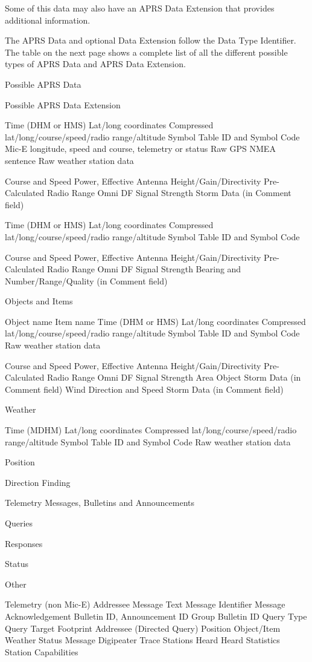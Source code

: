 Some of this data may also have an APRS Data Extension that provides
additional information.

The APRS Data and optional Data Extension follow the Data Type Identifier.
The table on the next page shows a complete list of all the different possible
types of APRS Data and APRS Data Extension.



Possible APRS Data

Possible APRS Data Extension

Time (DHM or HMS)
Lat/long coordinates
Compressed lat/long/course/speed/radio range/altitude
Symbol Table ID and Symbol Code
Mic-E longitude, speed and course, telemetry or status
Raw GPS NMEA sentence
Raw weather station data

Course and Speed
Power, Effective Antenna Height/Gain/Directivity
Pre-Calculated Radio Range
Omni DF Signal Strength
Storm Data (in Comment field)

Time (DHM or HMS)
Lat/long coordinates
Compressed lat/long/course/speed/radio range/altitude
Symbol Table ID and Symbol Code

Course and Speed
Power, Effective Antenna Height/Gain/Directivity
Pre-Calculated Radio Range
Omni DF Signal Strength
Bearing and Number/Range/Quality
(in Comment field)

Objects and
Items

Object name
Item name
Time (DHM or HMS)
Lat/long coordinates
Compressed lat/long/course/speed/radio range/altitude
Symbol Table ID and Symbol Code
Raw weather station data

Course and Speed
Power, Effective Antenna Height/Gain/Directivity
Pre-Calculated Radio Range
Omni DF Signal Strength
Area Object
Storm Data (in Comment field)
Wind Direction and Speed
Storm Data (in Comment field)

Weather

Time (MDHM)
Lat/long coordinates
Compressed lat/long/course/speed/radio range/altitude
Symbol Table ID and Symbol Code
Raw weather station data

Position

Direction Finding

Telemetry
Messages,
Bulletins and
Announcements

Queries

Responses

Status

Other

Telemetry (non Mic-E)
Addressee
Message Text
Message Identifier
Message Acknowledgement
Bulletin ID, Announcement ID
Group Bulletin ID
Query Type
Query Target Footprint
Addressee (Directed Query)
Position
Object/Item
Weather
Status
Message
Digipeater Trace
Stations Heard
Heard Statistics
Station Capabilities


